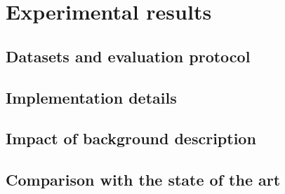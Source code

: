 \section{Experimental results}
\label{results}
\subsection{Datasets and evaluation protocol}
\subsection{Implementation details}
\subsection{Impact of background description}
\subsection{Comparison with the state of the art}
